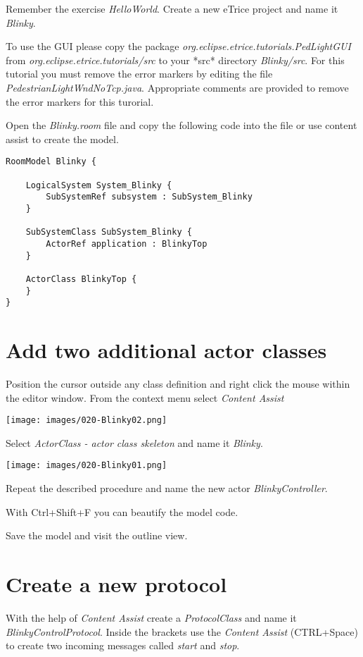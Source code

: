 Remember the exercise \textit{HelloWorld}.
Create a new eTrice project and name it \textit{Blinky}.

To use the GUI please copy the package \textit{org.eclipse.etrice.tutorials.PedLightGUI} from \textit{org.eclipse.etrice.tutorials/src} to your *src* directory \textit{Blinky/src}. For this tutorial you must remove the error markers by editing the file \textit{PedestrianLightWndNoTcp.java}. Appropriate comments are provided to remove the error markers for this turorial.

Open the \textit{Blinky.room} file and copy the following code into the file or use content assist to create the model.

\begin{verbatim} 
RoomModel Blinky {

    LogicalSystem System_Blinky {
        SubSystemRef subsystem : SubSystem_Blinky
    }

    SubSystemClass SubSystem_Blinky {
        ActorRef application : BlinkyTop
    }

    ActorClass BlinkyTop {
    }
}
\end{verbatim}

\section{Add two additional actor classes}

Position the cursor outside any class definition and right click the mouse within the editor window. From the context menu select \textit{Content Assist}  

\texttt{[image: images/020-Blinky02.png]}

Select \textit{ActorClass - actor class skeleton} and name it \textit{Blinky}.

\texttt{[image: images/020-Blinky01.png]}

Repeat the described procedure and name the new actor \textit{BlinkyController}.

With Ctrl+Shift+F you can beautify the model code. 

Save the model and visit the outline view.

\section{Create a new protocol}

With the help of \textit{Content Assist} create a \textit{ProtocolClass} and name it \textit{BlinkyControlProtocol}.
Inside the brackets use the \textit{Content Assist} (CTRL+Space) to create two incoming messages called \textit{start} and \textit{stop}.

